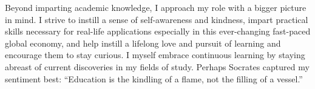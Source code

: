 \vspace{2ex}
Beyond imparting academic knowledge, I approach my role with a bigger picture in mind.  I strive to instill a sense of self-awareness and kindness, impart practical skills necessary for real-life applications especially in this ever-changing fast-paced global economy, and help instill a lifelong love and pursuit of learning and encourage them to stay curious.  I myself embrace continuous learning by staying abreast of current discoveries in my fields of study.  Perhaps Socrates captured my sentiment best: ``Education is the kindling of a flame, not the filling of a vessel.''
